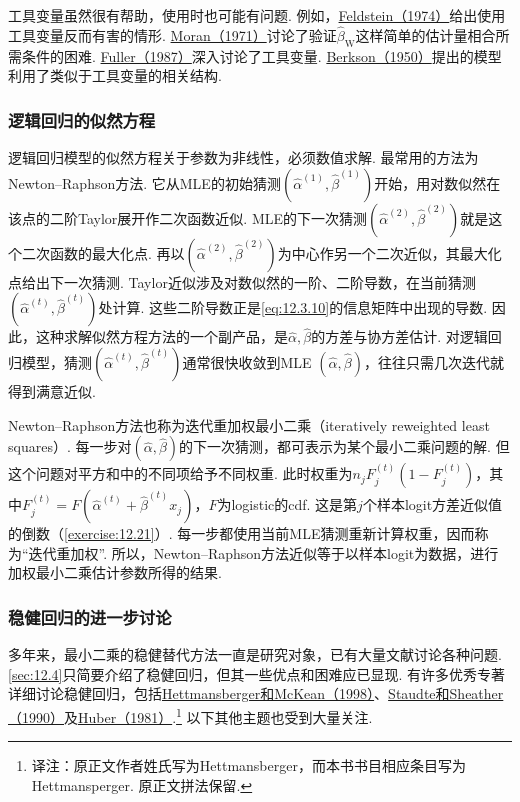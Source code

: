 工具变量虽然很有帮助，使用时也可能有问题. 例如，\hyperref[bib:source117]{Feldstein（1974）}给出使用工具变量反而有害的情形. \hyperref[bib:source222]{Moran（1971）}讨论了验证$\hat\beta_{\mathrm W}$这样简单的估计量相合所需条件的困难. \hyperref[bib:source130]{Fuller（1987）}深入讨论了工具变量. \hyperref[bib:source28]{Berkson（1950）}提出的模型利用了类似于工具变量的相关结构.

\subsubsection{逻辑回归的似然方程}\label{sec:12.6.4}
逻辑回归模型的似然方程关于参数为非线性，必须数值求解. 最常用的方法为Newton--Raphson方法. 它从MLE的初始猜测$(\hat\alpha^{(1)},\hat\beta^{(1)})$开始，用对数似然在该点的二阶Taylor展开作二次函数近似. MLE的下一次猜测$(\hat\alpha^{(2)},\hat\beta^{(2)})$就是这个二次函数的最大化点. 再以$(\hat\alpha^{(2)},\hat\beta^{(2)})$为中心作另一个二次近似，其最大化点给出下一次猜测. Taylor近似涉及对数似然的一阶、二阶导数，在当前猜测$(\hat\alpha^{(t)},\hat\beta^{(t)})$处计算. 这些二阶导数正是\eqref{eq:12.3.10}的信息矩阵中出现的导数. 因此，这种求解似然方程方法的一个副产品，是$\hat\alpha,\hat\beta$的方差与协方差估计. 对逻辑回归模型，猜测$(\hat\alpha^{(t)},\hat\beta^{(t)})$通常很快收敛到MLE $(\hat\alpha,\hat\beta)$，往往只需几次迭代就得到满意近似.

Newton--Raphson方法也称为迭代重加权最小二乘（iteratively reweighted least squares）. 每一步对$(\hat\alpha,\hat\beta)$的下一次猜测，都可表示为某个最小二乘问题的解. 但这个问题对平方和中的不同项给予不同权重. 此时权重为$n_jF_j^{(t)}(1-F_j^{(t)})$，其中$F_j^{(t)}=F(\hat\alpha^{(t)}+\hat\beta^{(t)}x_j)$，$F$为logistic的cdf. 这是第$j$个样本logit方差近似值的倒数（\autoref{exercise:12.21}）. 每一步都使用当前MLE猜测重新计算权重，因而称为“迭代重加权”. 所以，Newton--Raphson方法近似等于以样本logit为数据，进行加权最小二乘估计参数所得的结果.

\subsubsection{稳健回归的进一步讨论}\label{sec:12.6.5}
多年来，最小二乘的稳健替代方法一直是研究对象，已有大量文献讨论各种问题. \autoref{sec:12.4}只简要介绍了稳健回归，但其一些优点和困难应已显现. 有许多优秀专著详细讨论稳健回归，包括\hyperref[bib:source165]{Hettmansberger和McKean（1998）}、\hyperref[bib:source299]{Staudte和Sheather（1990）}及\hyperref[bib:source171]{Huber（1981）}.\footnote{译注：原正文作者姓氏写为Hettmansberger，而本书书目相应条目写为Hettmansperger. 原正文拼法保留.} 以下其他主题也受到大量关注.

